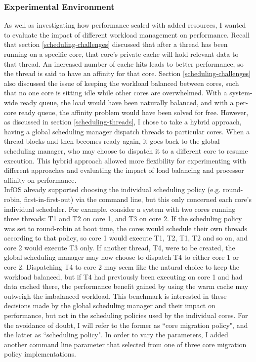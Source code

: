 \documentclass[bsc,frontabs,singlespacing,parskip,deptreport]{infthesis}
\begin{document}
\subsubsection{Experimental Environment}
As well as investigating how performance scaled with added resources, I wanted to evaluate the impact of different workload management on performance. Recall that section \ref{scheduling-challenges} discussed that after a thread has been running on a specific core, that core's private cache will hold relevant data to that thread. An increased number of cache hits leads to better performance, so the thread is said to have an affinity for that core. Section \ref{scheduling-challenges} also discussed the issue of keeping the workload balanced between cores, such that no one core is sitting idle while other cores are overwhelmed. With a system-wide ready queue, the load would have been naturally balanced, and with a per-core ready queue, the affinity problem would have been solved for free. However, as discussed in section \ref{scheduling-threads}, I chose to take a hybrid approach, having a global scheduling manager dispatch threads to particular cores. When a thread blocks and then becomes ready again, it goes back to the global scheduling manager, who may choose to dispatch it to a different core to resume execution. This hybrid approach allowed more flexibility for experimenting with different approaches and evaluating the impact of load balancing and processor affinity on performance. \\

InfOS already supported choosing the individual scheduling policy (e.g. round-robin, first-in-first-out) via the command line, but this only concerned each core's individual scheduler. For example, consider a system with two cores running three threads: T1 and T2 on core 1, and T3 on core 2. If the scheduling policy was set to round-robin at boot time, the cores would schedule their own threads according to that policy, so core 1 would execute T1, T2, T1, T2 and so on, and core 2 would execute T3 only. If another thread, T4, were to be created, the global scheduling manager may now choose to dispatch T4 to either core 1 or core 2. Dispatching T4 to core 2 may seem like the natural choice to keep the workload balanced, but if T4 had previously been executing on core 1 and had data cached there, the performance benefit gained by using the warm cache may outweigh the imbalanced workload. This benchmark is interested in these decisions made by the global scheduling manager and their impact on performance, but not in the scheduling policies used by the individual cores. For the avoidance of doubt, I will refer to the former as ``core migration policy", and the latter as ``scheduling policy". In order to vary the parameters, I added another command line parameter that selected from one of three core migration policy implementations.
\end{document}
